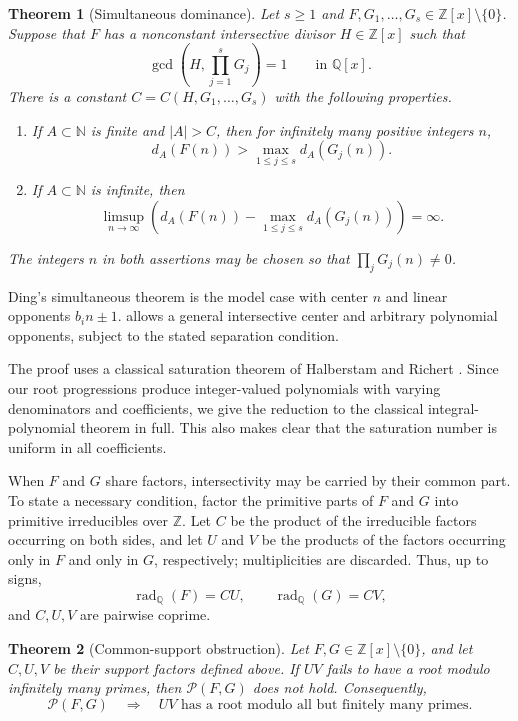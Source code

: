 \documentclass[11pt]{amsart}
\newcommand{\N}{\mathbb N}
\newcommand{\Z}{\mathbb Z}
\newcommand{\Q}{\mathbb Q}
\newcommand{\cP}{\mathcal P}
\newcommand{\radQ}{\operatorname{rad}_{\Q}}
\newtheorem{theorem}{Theorem}[section]
\theoremstyle{definition}
\begin{document}
\begin{theorem}[Simultaneous dominance]\label{thm:simultaneous-dominance}
Let \(s\ge1\) and \(F,G_1,\ldots,G_s\in\Z[x]\setminus\{0\}\).  Suppose that
\(F\) has a nonconstant intersective divisor \(H\in\Z[x]\) such that
\[
  \gcd\!\left(H,\prod_{j=1}^sG_j\right)=1
  \qquad\text{in \(\Q[x]\)}.
\]
There is a constant \(C=C(H,G_1,\ldots,G_s)\) with the following
properties.
\begin{enumerate}
  \item If \(A\subset\N\) is finite and \(|A|>C\), then for infinitely many
  positive integers \(n\),
  \[
    d_A(F(n))>\max_{1\le j\le s}d_A(G_j(n)).
  \]
  \item If \(A\subset\N\) is infinite, then
  \[
    \limsup_{n\to\infty}
    \left(d_A(F(n))-\max_{1\le j\le s}d_A(G_j(n))\right)=\infty.
  \]
\end{enumerate}
The integers \(n\) in both assertions may be chosen so that
\(\prod_jG_j(n)\ne0\).
\end{theorem}

Ding's simultaneous theorem \cite[Theorem 4]{DingProblem26} is the model
case with center \(n\) and linear opponents \(b_i n\pm1\).
 allows a general intersective center and
arbitrary polynomial opponents, subject to the stated separation condition.

The proof uses a classical saturation theorem of Halberstam and Richert
\cite[Theorem 10.11]{HalberstamRichert}.  Since our root progressions produce
integer-valued polynomials with varying denominators and coefficients, we
give the reduction to the classical integral-polynomial theorem in full.
This also makes clear that the saturation number is uniform in all
coefficients.

When \(F\) and \(G\) share factors, intersectivity may be carried by their
common part.  To state a necessary condition, factor the primitive parts of
\(F\) and \(G\) into primitive irreducibles over \(\Z\).  Let \(C\) be the
product of the irreducible factors occurring on both sides, and let \(U\)
and \(V\) be the products of the factors occurring only in \(F\) and only
in \(G\), respectively; multiplicities are discarded.  Thus, up to signs,
\[
  \radQ(F)=CU,\qquad \radQ(G)=CV,
\]
and \(C,U,V\) are pairwise coprime.

\begin{theorem}[Common-support obstruction]\label{thm:common-support}
Let \(F,G\in\Z[x]\setminus\{0\}\), and let \(C,U,V\) be their support
factors defined above.  If \(UV\) fails to have a root modulo infinitely many
primes, then \(\cP(F,G)\) does not hold.  Consequently,
\[
  \cP(F,G)\quad\Longrightarrow\quad
  UV\text{ has a root modulo all but finitely many primes}.
\]
\end{theorem}
\end{document}
